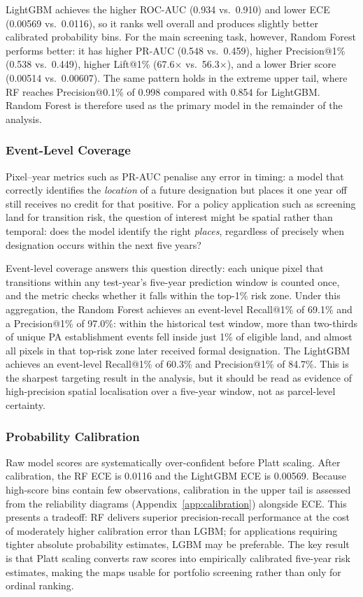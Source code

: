 \documentclass[12pt]{article}
\theoremstyle{break}
\begin{document}
LightGBM achieves the higher ROC-AUC (0.934 vs.\ 0.910) and lower ECE (0.00569
vs.\ 0.0116), so it ranks well overall and produces slightly better calibrated
probability bins. For the main screening task, however, Random Forest performs better:
it has higher PR-AUC (0.548 vs.\ 0.459), higher Precision@1\% (0.538 vs.\ 0.449),
higher Lift@1\% (67.6$\times$ vs.\ 56.3$\times$), and a lower Brier score (0.00514
vs.\ 0.00607). The same pattern holds in the extreme upper tail, where RF reaches
Precision@0.1\% of 0.998 compared with 0.854 for LightGBM. Random Forest is therefore
used as the primary model in the remainder of the analysis.

\subsubsection{Event-Level Coverage}
\label{sec:results_sa_events}

Pixel--year metrics such as PR-AUC penalise any error in timing: a model that
correctly identifies the \emph{location} of a future designation but places it one
year off still receives no credit for that positive. For a policy application such as
screening land for transition risk, the question of interest might be spatial rather than
temporal: does the model identify the right \emph{places}, regardless of precisely
when designation occurs within the next five years?

Event-level coverage answers this question directly: each unique pixel that transitions
within any test-year's five-year prediction window is counted once, and the metric
checks whether it falls within the top-1\% risk zone. Under this aggregation,
the Random Forest achieves an event-level Recall@1\% of 69.1\% and a
Precision@1\% of 97.0\%: within the historical test window, more than two-thirds of
unique PA establishment events fell inside just 1\% of eligible land, and almost all
pixels in that top-risk zone later received formal designation. The LightGBM achieves
an event-level Recall@1\% of 60.3\% and Precision@1\% of 84.7\%. This is the
sharpest targeting result in the analysis, but it should be read as evidence of
high-precision spatial localisation over a five-year window, not as parcel-level
certainty.

\subsubsection{Probability Calibration}
\label{sec:results_sa_calibration}

Raw model scores are systematically over-confident before Platt scaling. After
calibration, the RF ECE is 0.0116 and the LightGBM ECE is 0.00569. Because
high-score bins contain few observations, calibration in the upper tail is assessed
from the reliability diagrams (Appendix~\ref{app:calibration}) alongside ECE. This
presents a tradeoff: RF delivers superior precision-recall performance at the cost of
moderately higher calibration error than LGBM; for applications requiring tighter
absolute probability estimates, LGBM may be preferable. The key result is that Platt
scaling converts raw scores into empirically calibrated five-year risk estimates,
making the maps usable for portfolio screening rather than only for ordinal ranking.
\end{document}

